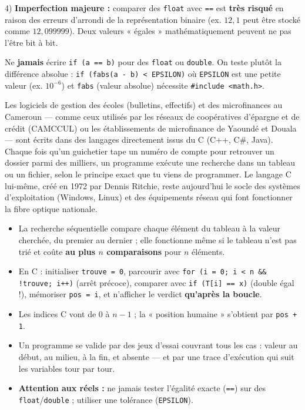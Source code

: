 \documentclass[11pt]{article}
\newcommand{\cle}[1]{{\popxbold\color{popdark}#1}}
\begin{document}
\begin{exoresolu}
4) \textbf{Imperfection majeure :} comparer des \texttt{float} avec \texttt{==} est \textbf{très risqué} en raison des erreurs d'arrondi de la représentation binaire (ex. $12{,}1$ peut être stocké comme $12{,}099999$). Deux valeurs « égales » mathématiquement peuvent ne pas l'être bit à bit.
\begin{attention}
Ne \textbf{jamais} écrire \texttt{if (a == b)} pour des \texttt{float} ou \texttt{double}. On teste plutôt la différence absolue : \texttt{if (fabs(a - b) < EPSILON)} où \texttt{EPSILON} est une petite valeur (ex. $10^{-6}$) et \texttt{fabs} (valeur absolue) nécessite \texttt{\#include <math.h>}.
\end{attention}
\end{exoresolu}

\begin{savaistu}
Les logiciels de gestion des écoles (bulletins, effectifs) et des microfinances au Cameroun — comme ceux utilisés par les réseaux de coopératives d'épargne et de crédit (CAMCCUL) ou les établissements de microfinance de Yaoundé et Douala — sont écrits dans des langages directement issus du C (C++, C\#, Java). Chaque fois qu'un guichetier tape un numéro de compte pour retrouver un dossier parmi des milliers, un programme exécute une recherche dans un tableau ou un fichier, selon le principe exact que tu viens de programmer. Le langage C lui-même, créé en 1972 par Dennis Ritchie, reste aujourd'hui le socle des systèmes d'exploitation (Windows, Linux) et des équipements réseau qui font fonctionner la fibre optique nationale.
\end{savaistu}

\begin{aretenir}
\begin{itemize}
\item La \cle{recherche séquentielle} compare chaque élément du tableau à la valeur cherchée, du premier au dernier ; elle fonctionne même si le tableau n'est pas trié et coûte \textbf{au plus $n$ comparaisons} pour $n$ éléments.
\item En C : initialiser \texttt{trouve = 0}, parcourir avec \texttt{for (i = 0; i < n \&\& !trouve; i++)} (arrêt précoce), comparer avec \texttt{if (T[i] == x)} (double égal !), mémoriser \texttt{pos = i}, et n'afficher le verdict \textbf{qu'après la boucle}.
\item Les indices C vont de $0$ à $n-1$ ; la « position humaine » s'obtient par \texttt{pos + 1}.
\item Un programme se valide par des \cle{jeux d'essai} couvrant tous les cas : valeur au début, au milieu, à la fin, et absente — et par une \cle{trace d'exécution} qui suit les variables tour par tour.
\item \textbf{Attention aux réels :} ne jamais tester l'égalité exacte (\texttt{==}) sur des \texttt{float}/\texttt{double} ; utiliser une tolérance (\texttt{EPSILON}).
\end{itemize}
\end{aretenir}
\end{document}
